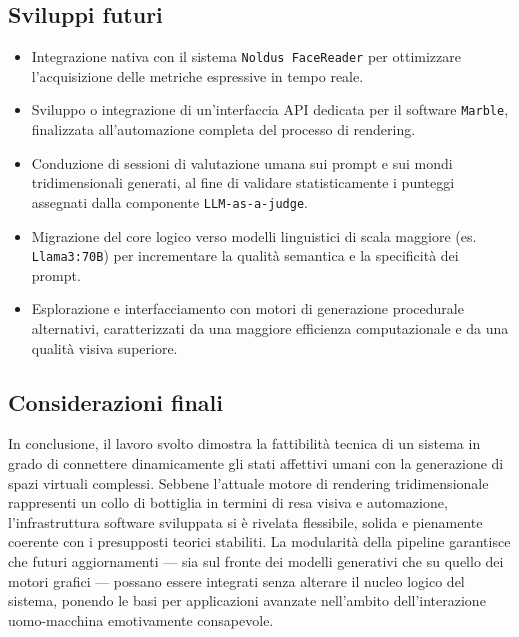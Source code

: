 \documentclass[11pt]{report}
\begin{document}
\subsection*{Sviluppi futuri}
\begin{itemize}
    \item Integrazione nativa con il sistema \texttt{Noldus FaceReader} per ottimizzare l'acquisizione delle metriche espressive in tempo reale.
    \item Sviluppo o integrazione di un'interfaccia API dedicata per il software \texttt{Marble}, finalizzata all'automazione completa del processo di rendering.
    \item Conduzione di sessioni di valutazione umana sui prompt e sui mondi tridimensionali generati, al fine di validare statisticamente i punteggi assegnati dalla componente \texttt{LLM-as-a-judge}.
    \item Migrazione del core logico verso modelli linguistici di scala maggiore (es. \texttt{Llama3:70B}) per incrementare la qualità semantica e la specificità dei prompt.
    \item Esplorazione e interfacciamento con motori di generazione procedurale alternativi, caratterizzati da una maggiore efficienza computazionale e da una qualità visiva superiore.
\end{itemize}

\subsection*{Considerazioni finali}
In conclusione, il lavoro svolto dimostra la fattibilità tecnica di un sistema in grado di connettere dinamicamente gli stati affettivi umani con la generazione di spazi virtuali complessi. Sebbene l'attuale motore di rendering tridimensionale rappresenti un collo di bottiglia in termini di resa visiva e automazione, l'infrastruttura software sviluppata si è rivelata flessibile, solida e pienamente coerente con i presupposti teorici stabiliti. La modularità della pipeline garantisce che futuri aggiornamenti — sia sul fronte dei modelli generativi che su quello dei motori grafici — possano essere integrati senza alterare il nucleo logico del sistema, ponendo le basi per applicazioni avanzate nell'ambito dell'interazione uomo-macchina emotivamente consapevole.
 
\end{document}
